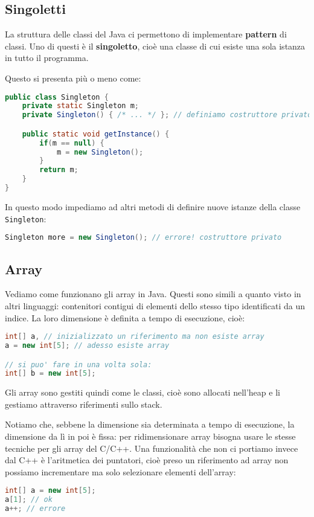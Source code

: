 \documentclass[a4paper,11pt]{article}
\begin{document}
\subsection{Singoletti}
La struttura delle classi del Java ci permettono di implementare \textbf{pattern} di classi.
Uno di questi è il \textbf{singoletto}, cioè una classe di cui esiste una sola istanza in tutto il programma.

Questo si presenta più o meno come:
\begin{lstlisting}[language=java, style=codestyle]	
public class Singleton {
	private static Singleton m;
	private Singleton() { /* ... */ }; // definiamo costruttore privato

	public static void getInstance() {
		if(m == null) {
			m = new Singleton();
		}
		return m;
	}
}
\end{lstlisting}

In questo modo impediamo ad altri metodi di definire nuove istanze della classe \lstinline|Singleton|:
\begin{lstlisting}[language=java, style=codestyle]	
Singleton more = new Singleton(); // errore! costruttore privato 
\end{lstlisting}

\subsection{Array}
Vediamo come funzionano gli array in Java.
Questi sono simili a quanto visto in altri linguaggi: contenitori contigui di elementi dello stesso tipo identificati da un indice.
La loro dimensione è definita a tempo di esecuzione, cioè: 
\begin{lstlisting}[language=java, style=codestyle]	
int[] a, // inizializzato un riferimento ma non esiste array
a = new int[5]; // adesso esiste array

// si puo' fare in una volta sola:
int[] b = new int[5];
\end{lstlisting}

Gli array sono gestiti quindi come le classi, cioè sono allocati nell'heap e li gestiamo attraverso riferimenti sullo stack.

Notiamo che, sebbene la dimensione sia determinata a tempo di esecuzione, la dimensione da lì in poi è fissa: per ridimensionare array bisogna usare le stesse tecniche per gli array del C/C++.
Una funzionalità che non ci portiamo invece dal C++ è l'aritmetica dei puntatori, cioè preso un riferimento ad array non possiamo incrementare ma solo selezionare elementi dell'array:
\begin{lstlisting}[language=java, style=codestyle]	
int[] a = new int[5];
a[1]; // ok
a++; // errore
\end{lstlisting}
\end{document}
